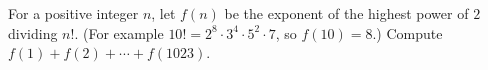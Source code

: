 For a positive integer $n$, let $f(n)$ be the exponent of the highest power of $2$ dividing $n!$. (For example $10!=2^8\cdot3^4\cdot5^2\cdot7$, so $f(10)=8$.) Compute $f(1)+f(2)+\cdots+f(1023)$.
